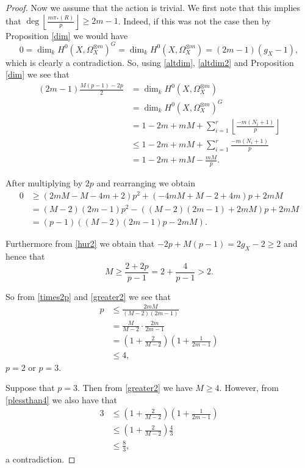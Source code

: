 \begin{proof}
    Now we assume that the action is trivial.
    We first note that this implies that $\deg \left\lfloor\frac{m\pi_*(R)}{p}\right\rfloor \geq 2m-1$.
    Indeed, if this was not the case then by Proposition \ref{dim} we would have 
        \[ 
        0= \dim_kH^0(X,\Omega_X^{\otimes m})^G = \dim_kH^0(X,\Omega_X^{\otimes m})=(2m-1)(g_X-1),
        \]
    which is clearly a contradiction.
    So, using \eqref{altdim}, \eqref{altdim2} and Proposition \ref{dim} we see that
        \begin{align}\label{bound}
        (2m-1)\frac{M(p-1)-2p}{2} & = \dim_kH^0(X,\Omega_X^{\otimes m}) \nonumber\\
        & =  \dim_kH^0(X,\Omega_X^{\otimes m})^G \nonumber\\
        & =  1-2m+mM+\sum_{i=1}^r\left\lfloor\frac{-m(N_i+1)}{p}\right\rfloor\nonumber \\
        & \leq  1-2m+mM+\sum_{i=1}^r\frac{-m(N_i+1)}{p}\nonumber \\
        & =  1-2m+mM-\frac{mM}{p}.
        \end{align}
    
    After multiplying by $2p$ and rearranging we obtain
        \begin{align}\label{times2p}
        0 & \geq  (2mM-M-4m+2)p^2+(-4mM+M-2+4m)p+2mM \nonumber \\
            & =  (M-2)(2m-1)p^2-((M-2)(2m-1)+2mM)p+2mM \nonumber \\
        & =  (p-1)((M-2)(2m-1)p-2mM).
        \end{align}
    
    Furthermore from \eqref{hur2} we obtain that $-2p+M(p-1)=2g_X-2 \geq 2$ and hence that 
        \begin{equation}\label{greater2}
        M\geq \frac{2+2p}{p-1}=2+\frac{4}{p-1}>2.
        \end{equation}
    
    So from \eqref{times2p} and \eqref{greater2} we see that
        \begin{align}\label{plessthan4}
        p & \leq  \frac{2mM}{(M-2)(2m-1)}\nonumber\\
        & =  \frac{M}{M-2}\cdot\frac{2m}{2m-1}\nonumber\\
        & =  \left( 1+\frac{2}{M-2} \right) \left(1+\frac{1}{2m-1} \right)\\
        & \leq  4, \nonumber	
        \end{align}
    \ie $p=2$ or $p=3$. 
    
    Suppose that $p=3$. Then from \eqref{greater2} we have $M\geq 4$. However, from  \eqref{plessthan4} we also have that 
        \begin{align*}
        3 & \leq \left( 1+\frac{2}{M-2} \right) \left(1+\frac{1}{2m-1} \right)\\
        & \leq  \left( 1+\frac{2}{M-2} \right) \frac{4}{3}\\
        & \leq  \frac{8}{3},
        \end{align*}
    a contradiction.
    

\end{proof}

